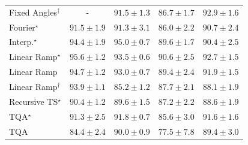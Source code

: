 \begin{tabular}{l|cccc|}
Fixed Angles$^\dagger$ & {\cellcolor[HTML]{000000}} \color[HTML]{F1F1F1} {\cellcolor{white}} \color{black} - & {\cellcolor[HTML]{258745}} \color[HTML]{F1F1F1} $91.5\pm 1.3$ & {\cellcolor[HTML]{5AB76A}} \color[HTML]{F1F1F1} $86.7\pm 1.7$ & {\cellcolor[HTML]{177B3F}} \color[HTML]{F1F1F1} $92.9\pm 1.6$ \\
Fourier$^\star$ & {\cellcolor[HTML]{258745}} \color[HTML]{F1F1F1} $91.5\pm 1.9$ & {\cellcolor[HTML]{268846}} \color[HTML]{F1F1F1} $91.3\pm 3.1$ & {\cellcolor[HTML]{64BC6F}} \color[HTML]{F1F1F1} $86.0\pm 2.2$ & {\cellcolor[HTML]{2C8F4B}} \color[HTML]{F1F1F1} $90.7\pm 2.4$ \\
Interp.$^\star$ & {\cellcolor[HTML]{086E3A}} \color[HTML]{F1F1F1} $94.4\pm 1.9$ & {\cellcolor[HTML]{016937}} \color[HTML]{F1F1F1} $95.0\pm 0.7$ & {\cellcolor[HTML]{359C53}} \color[HTML]{F1F1F1} $89.6\pm 1.7$ & {\cellcolor[HTML]{2F934D}} \color[HTML]{F1F1F1} $90.4\pm 2.5$ \\
Linear Ramp$^\star$ & {\cellcolor[HTML]{006435}} \color[HTML]{F1F1F1} $95.6\pm 1.2$ & {\cellcolor[HTML]{11753D}} \color[HTML]{F1F1F1} $93.5\pm 0.6$ & {\cellcolor[HTML]{2D914B}} \color[HTML]{F1F1F1} $90.6\pm 2.5$ & {\cellcolor[HTML]{197C40}} \color[HTML]{F1F1F1} $92.7\pm 1.5$ \\
Linear Ramp & {\cellcolor[HTML]{056C39}} \color[HTML]{F1F1F1} $94.7\pm 1.2$ & {\cellcolor[HTML]{167A3F}} \color[HTML]{F1F1F1} $93.0\pm 0.7$ & {\cellcolor[HTML]{379E54}} \color[HTML]{F1F1F1} $89.4\pm 2.4$ & {\cellcolor[HTML]{218242}} \color[HTML]{F1F1F1} $91.9\pm 1.5$ \\
Linear Ramp$^\dagger$ & {\cellcolor[HTML]{0D733C}} \color[HTML]{F1F1F1} $93.9\pm 1.1$ & {\cellcolor[HTML]{70C275}} \color[HTML]{000000} $85.2\pm 1.2$ & {\cellcolor[HTML]{49AF61}} \color[HTML]{F1F1F1} $87.7\pm 2.1$ & {\cellcolor[HTML]{43AC5E}} \color[HTML]{F1F1F1} $88.1\pm 1.9$ \\
Recursive TS$^\star$ & {\cellcolor[HTML]{2F934D}} \color[HTML]{F1F1F1} $90.4\pm 1.2$ & {\cellcolor[HTML]{359C53}} \color[HTML]{F1F1F1} $89.6\pm 1.5$ & {\cellcolor[HTML]{51B365}} \color[HTML]{F1F1F1} $87.2\pm 2.2$ & {\cellcolor[HTML]{3EA75A}} \color[HTML]{F1F1F1} $88.6\pm 1.9$ \\
TQA$^\star$ & {\cellcolor[HTML]{268846}} \color[HTML]{F1F1F1} $91.3\pm 2.5$ & {\cellcolor[HTML]{228343}} \color[HTML]{F1F1F1} $91.8\pm 0.7$ & {\cellcolor[HTML]{6BC072}} \color[HTML]{000000} $85.6\pm 3.0$ & {\cellcolor[HTML]{248644}} \color[HTML]{F1F1F1} $91.6\pm 1.6$ \\
TQA & {\cellcolor[HTML]{7EC97B}} \color[HTML]{000000} $84.4\pm 2.4$ & {\cellcolor[HTML]{31974F}} \color[HTML]{F1F1F1} $90.0\pm 0.9$ & {\cellcolor[HTML]{DCF1A5}} \color[HTML]{000000} $77.5\pm 7.8$ & {\cellcolor[HTML]{379E54}} \color[HTML]{F1F1F1} $89.4\pm 3.0$ \\

\end{tabular}
